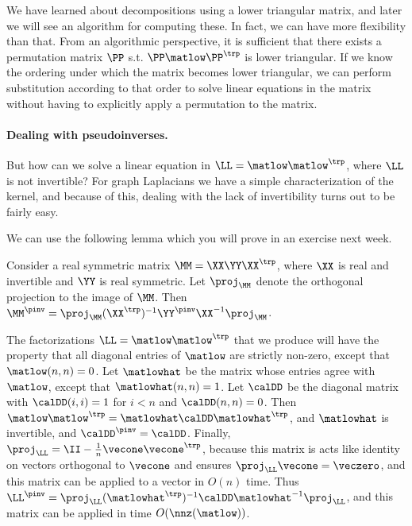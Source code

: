 \begin{remark}
 We have learned about decompositions using a lower triangular matrix, and later we
 will see an algorithm for computing these.
 In fact, we can have more flexibility than that. From an algorithmic perspective, it is
 sufficient that there exists a permutation matrix $\PP$ s.t. $\PP
 \matlow \PP^{\trp}$ is lower triangular. If we know the ordering
 under which the matrix becomes lower triangular, we can perform
 substitution according to that order to solve linear equations in the
 matrix without having to explicitly apply a permutation to the matrix.
\end{remark}


\paragraph{Dealing with pseudoinverses.} But how can we solve a linear equation in $\LL = \matlow
\matlow^\trp$, where $\LL$ is not invertible? For graph
Laplacians we have a simple characterization of the kernel, and because
of this, dealing with the lack of invertibility turns out
to be fairly easy.

We can use the following lemma which you will prove in an exercise
next week.
\begin{lemma}
  Consider a real symmetric matrix $\MM = \XX \YY \XX^\trp$, where
  $\XX$ is real and invertible and
  $\YY$ is real symmetric.
  Let $\proj_{\MM}$ denote the orthogonal projection to the image
  of $\MM$.
  Then $\MM^{\pinv} = \proj_{\MM} (\XX^\trp)^{-1}\YY^{\pinv} \XX^{-1}\proj_{\MM}$.
\end{lemma}

The factorizations $\LL = \matlow \matlow^\trp$ that we produce will
have the property that all diagonal entries of $\matlow$ are strictly
non-zero, except that $\matlow(n,n) = 0$.
Let $\matlowhat$ be the matrix whose entries
agree with $\matlow$, except that $\matlowhat(n,n) = 1$.
Let $\calDD$ be the diagonal matrix with $\calDD(i,i) = 1$ for $i < n$
and $\calDD(n,n) = 0$.
Then $\matlow \matlow^{\trp} = \matlowhat\calDD
\matlowhat^{\trp}$, and $\matlowhat$ is invertible, and $\calDD^{\pinv} = \calDD$.
Finally, $\proj_{\LL} = \II - \frac{1}{n}\vecone\vecone^{\trp}$,
because this matrix is acts like identity on vectors orthogonal to
$\vecone$ and ensures $\proj_{\LL} \vecone = \veczero$,
and this matrix can be applied to a vector in $O(n)$ time.
Thus $\LL^{\pinv}  = \proj_{\LL}(\matlowhat^\trp)^{-1}\calDD
\matlowhat^{-1}\proj_{\LL}$, and this matrix can be applied in time $O(\nnz(\matlow))$.

